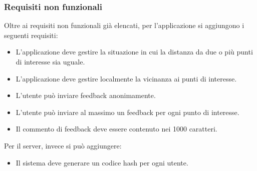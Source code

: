 \subsubsection{Requisiti non funzionali}
Oltre ai requisiti non funzionali già elencati, per l'applicazione si aggiungono i seguenti requisiti:
\begin{itemize}
\item L'applicazione deve gestire la situazione in cui la distanza da due o più punti di interesse sia uguale.
\item L'applicazione deve gestire localmente la vicinanza ai punti di interesse.
\item L'utente può inviare feedback anonimamente.
\item L'utente può inviare al massimo un feedback per ogni punto di interesse.
\item Il commento di feedback deve essere contenuto nei 1000 caratteri.
\end{itemize}

Per il server, invece si può aggiungere:
\begin{itemize}
\item Il sistema deve generare un codice hash per ogni utente.
\end{itemize}



